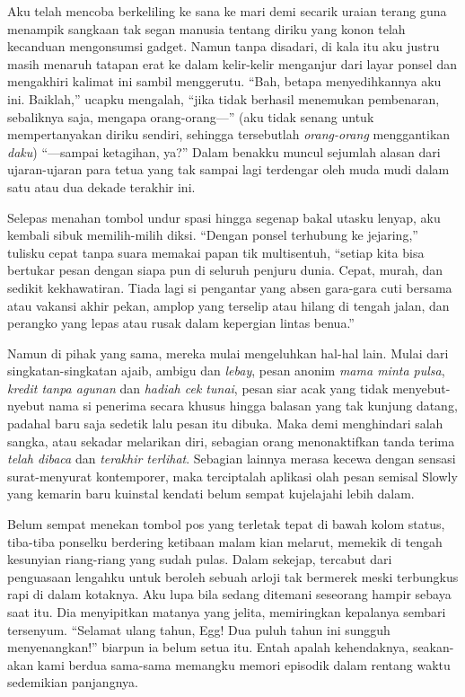 \documentclass[smalldemyvopaper,11pt,twoside,onecolumn,openright,extrafontsizes]{memoir}
\begin{document}

Aku telah mencoba berkeliling ke sana ke mari demi secarik uraian terang guna menampik sangkaan tak segan manusia tentang diriku yang konon telah kecanduan mengonsumsi gadget. Namun tanpa disadari, di kala itu aku justru masih menaruh tatapan erat ke dalam kelir-kelir menganjur dari layar ponsel dan mengakhiri kalimat ini sambil menggerutu. ``Bah, betapa menyedihkannya aku ini. Baiklah,'' ucapku mengalah, ``jika tidak berhasil menemukan pembenaran, sebaliknya saja, mengapa orang-orang---'' (aku tidak senang untuk mempertanyakan diriku sendiri, sehingga tersebutlah \textit{orang-orang} menggantikan \textit{daku}) ``---sampai ketagihan, ya?'' Dalam benakku muncul sejumlah alasan dari ujaran-ujaran para tetua yang tak sampai lagi terdengar oleh muda mudi dalam satu atau dua dekade terakhir ini.


Selepas menahan tombol undur spasi hingga segenap bakal utasku lenyap, aku kembali sibuk memilih-milih diksi. ``Dengan ponsel terhubung ke jejaring,'' tulisku cepat tanpa suara memakai papan tik multisentuh, ``setiap kita bisa bertukar pesan dengan siapa pun di seluruh penjuru dunia. Cepat, murah, dan sedikit kekhawatiran. Tiada lagi si pengantar yang absen gara-gara cuti bersama atau vakansi akhir pekan, amplop yang terselip atau hilang di tengah jalan, dan perangko yang lepas atau rusak dalam kepergian lintas benua.''


Namun di pihak yang sama, mereka mulai mengeluhkan hal-hal lain. Mulai dari singkatan-singkatan ajaib, ambigu dan \textit{lebay}, pesan anonim \textit{mama minta pulsa}, \textit{kredit tanpa agunan} dan \textit{hadiah cek tunai}, pesan siar acak yang tidak menyebut-nyebut nama si penerima secara khusus hingga balasan yang tak kunjung datang, padahal baru saja sedetik lalu pesan itu dibuka. Maka demi menghindari salah sangka, atau sekadar melarikan diri, sebagian orang menonaktifkan tanda terima \textit{telah dibaca} dan \textit{terakhir terlihat}. Sebagian lainnya merasa kecewa dengan sensasi surat-menyurat kontemporer, maka terciptalah aplikasi olah pesan semisal Slowly yang kemarin baru kuinstal kendati belum sempat kujelajahi lebih dalam.


Belum sempat menekan tombol pos yang terletak tepat di bawah kolom status, tiba-tiba ponselku berdering ketibaan malam kian melarut, memekik di tengah kesunyian riang-riang yang sudah pulas. Dalam sekejap, tercabut dari penguasaan lengahku untuk beroleh sebuah arloji tak bermerek meski terbungkus rapi di dalam kotaknya. Aku lupa bila sedang ditemani seseorang hampir sebaya saat itu. Dia menyipitkan matanya yang jelita, memiringkan kepalanya sembari tersenyum. ``Selamat ulang tahun, Egg! Dua puluh tahun ini sungguh menyenangkan!'' biarpun ia belum setua itu. Entah apalah kehendaknya, seakan-akan kami berdua sama-sama memangku memori episodik dalam rentang waktu sedemikian panjangnya.
\end{document}
